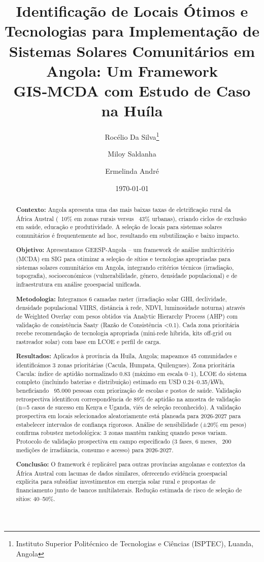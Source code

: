 \documentclass[12pt, a4paper]{article}
\begin{document}
\title{Identificação de Locais Ótimos e Tecnologias para Implementação de Sistemas Solares Comunitários em Angola: Um Framework GIS‑MCDA com Estudo de Caso na Huíla}
\author{Rocélio Da Silva\thanks{Instituto Superior Politécnico de Tecnologias e Ciências (ISPTEC), Luanda, Angola} \and Miloy Saldanha \and Ermelinda André}
\date{\today}
\maketitle

\begin{abstract}
\textbf{Contexto:} Angola apresenta uma das mais baixas taxas de eletrificação rural da África Austral (~10\% em zonas rurais versus ~43\% urbanas), criando ciclos de exclusão em saúde, educação e produtividade. A seleção de locais para sistemas solares comunitários é frequentemente ad hoc, resultando em subutilização e baixo impacto.

\textbf{Objetivo:} Apresentamos GEESP-Angola – um framework de análise multicritério (MCDA) em SIG para otimizar a seleção de sítios e tecnologias apropriadas para sistemas solares comunitários em Angola, integrando critérios técnicos (irradiação, topografia), socioeconómicos (vulnerabilidade, género, densidade populacional) e de infraestrutura em análise geoespacial unificada.

\textbf{Metodologia:} Integramos 6 camadas raster (irradiação solar GHI, declividade, densidade populacional VIIRS, distância à rede, NDVI, luminosidade noturna) através de Weighted Overlay com pesos obtidos via Analytic Hierarchy Process (AHP) com validação de consistência Saaty (Razão de Consistência <0.1). Cada zona prioritária recebe recomendação de tecnologia apropriada (mini-rede híbrida, kits off-grid ou rastreador solar) com base em LCOE e perfil de carga.

\textbf{Resultados:} Aplicados à província da Huíla, Angola; mapeamos 45 comunidades e identificámos 3 zonas prioritárias (Cacula, Humpata, Quilengues). Zona prioritária Cacula: índice de aptidão normalizado 0.83 (máximo em escala 0–1), LCOE do sistema completo (incluindo baterias e distribuição) estimado em USD 0.24–0.35/kWh, beneficiando ~95.000 pessoas com priorização de escolas e postos de saúde. Validação retrospectiva identificou correspondência de 89\% de aptidão na amostra de validação (n=5 casos de sucesso em Kenya e Uganda, viés de seleção reconhecido). A validação prospectiva em locais selecionados aleatoriamente está planeada para 2026-2027 para estabelecer intervalos de confiança rigorosos. Análise de sensibilidade (±20\% em pesos) confirma robustez metodológica: 3 zonas mantêm ranking quando pesos variam. Protocolo de validação prospectiva em campo especificado (3 fases, 6 meses, ~200 medições de irradiância, consumo e acesso) para 2026-2027.

\textbf{Conclusão:} O framework é replicável para outras províncias angolanas e contextos da África Austral com lacunas de dados similares, oferecendo evidência geoespacial explícita para subsidiar investimentos em energia solar rural e propostas de financiamento junto de bancos multilaterais. Redução estimada de risco de seleção de sítios: 40–50\%.
\end{abstract}
\end{document}
